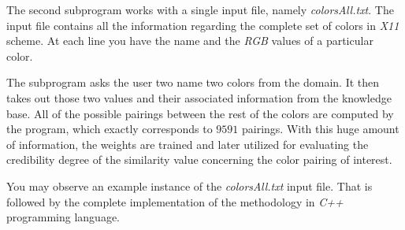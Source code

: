 \documentclass[egilmezThesis.tex]{subfiles}
\begin{document}
The second subprogram works with a single input file, namely \textit{colorsAll.txt}.  The input file contains all the information regarding the complete set of colors in \textit{X11} scheme. At each line you have the name and the \textit{RGB} values of a particular color. 

The subprogram asks the user two name two colors from the domain. It then takes out those two values and their associated information from the knowledge base. All of the possible pairings between the rest of the colors are computed by the program, which exactly corresponds to $9591$ pairings. With this huge amount of information, the weights are trained and later utilized for evaluating the credibility degree of the similarity value concerning the color pairing of interest.

You may observe an example instance of the \textit{colorsAll.txt} input file. That is followed by the complete implementation of the methodology in \textit{C++} programming language.
\end{document}
